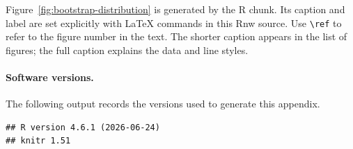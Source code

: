Figure~\ref{fig:bootstrap-distribution} is generated by the R chunk.
Its caption and label are set explicitly with LaTeX commands in this Rnw
source. Use \verb|\ref| to refer to the figure number in the text.
The shorter caption appears in the list of figures; the full caption
explains the data and line styles.


\paragraph{Software versions.}
The following output records the versions used to generate this appendix.

\begin{knitrout}
\color{fgcolor}\begin{kframe}
\begin{verbatim}
## R version 4.6.1 (2026-06-24) 
## knitr 1.51
\end{verbatim}
\end{kframe}
\end{knitrout}
